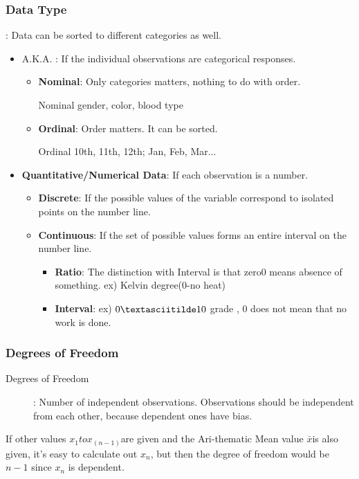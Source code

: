 \subsubsection{Data Type}: Data can be sorted to different categories as well.
\begin{itemize}
    \item {} A.K.A. : If the individual observations are categorical responses.
    \begin{itemize}
        \item \textbf{Nominal}: Only categories matters, nothing to do with order. \\
        \begin{examplebox}{Nominal}
        gender, color, blood type
        \end{examplebox}
        
        \item \textbf{Ordinal}: Order matters. It can be sorted. \\
        \begin{examplebox}{Ordinal}
        10th, 11th, 12th; Jan, Feb, Mar...
        \end{examplebox}
    \end{itemize}
    \item \textbf{Quantitative/Numerical Data}: If each observation is a number.
    \begin{itemize}
        \item \textbf{Discrete}: If the possible values of the variable correspond to isolated points on the number line.
        \item \textbf{Continuous}: If the set of possible values forms an entire interval on the number line.
        \begin{itemize}
            \item \textbf{Ratio}: The distinction with Interval is that zero0 means absence of something. ex) Kelvin degree(0-no heat)
            \item \textbf{Interval}: ex) $0\textasciitilde 10$ grade
, 0 does not mean that no work is done.        \end{itemize}
    \end{itemize}
\end{itemize}

\subsubsection{Degrees of Freedom}
 \begin{description} 
    \item[Degrees of Freedom]: Number of independent observations. Observations should be independent from each other, because dependent ones have bias. 
 \end{description} 
 If other values $x_1 to x_(n-1)$are given and the Ari-thematic Mean value $\bar x$is also given, it's easy to calculate out $x_n$, but then the degree of freedom would be $n-1$ since $x_n$ is dependent. 
